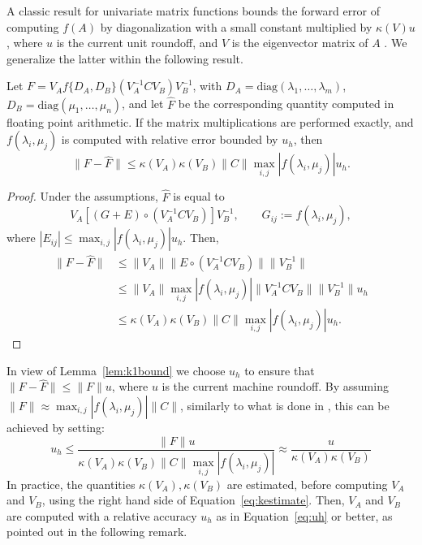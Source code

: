 \documentclass{siamart1116}
\newcommand{\norm}[1]{\lVert#1\rVert}
\begin{document}
A classic result for univariate matrix functions bounds
the forward error of computing $f(A)$ by diagonalization
with a small constant multiplied by $\kappa(V) u$, where 
$u$ is the current unit roundoff, and 
$V$ is the eigenvector matrix of $A$ \cite[page 82]{higham2008functions}. 
We generalize the latter within the following result.

\begin{lemma} \label{lem:k1bound}
  Let $F = V_A f\{ D_A, D_B \} (V_A^{-1} C V_B) V_B^{-1}$, 
  with $D_A = \mathrm{diag}(\lambda_1, \ldots, \lambda_m)$,
  $D_B = \mathrm{diag}(\mu_1, \ldots, \mu_n)$, 
  and let $\hat F$ be the corresponding  quantity computed 
  in floating point arithmetic. 
  If the matrix multiplications
  are performed exactly, and $f(\lambda_i, \mu_j)$ 
  is computed with relative error bounded by $u_h$, 
  then
  \[
    \norm{F - \hat F} \leq
      \kappa(V_A) \kappa(V_B) \norm{C} 
      \max_{i,j} |f(\lambda_i, \mu_j)| u_h.
  \]
\end{lemma}

\begin{proof}
    Under the assumptions, $\hat F$ is equal to
    \[
      V_A \left[ (G + E) \circ (V_A^{-1} C V_B) \right] V_B^{-1}, 
      \qquad 
      G_{ij} := f(\lambda_i, \mu_j), 
    \]
    where $|E_{ij}| \leq \max_{i,j} |f(\lambda_i, \mu_j)| u_h$. Then, 
    \begin{align*}
      \norm{F - \hat F} &\leq 
        \norm{V_A} \norm{E \circ (V_A^{-1} C V_B)} \norm{V_B^{-1}} \\
        &\leq \norm{V_A} 
        \max_{i,j} |f(\lambda_i, \mu_j)|
        \norm{V_A^{-1} C V_B} \norm{V_B^{-1}} u_h \\
        &\leq 
          \kappa(V_A) \kappa(V_B) \norm{C}
            \max_{i,j} |f(\lambda_i, \mu_j)|
        u_h.
    \end{align*}
\end{proof}

In view of Lemma~\ref{lem:k1bound} we 
choose $u_h$ to ensure that 
$\norm{F - \hat F} \leq \norm{F} u$, where $u$ is the current
machine roundoff. By assuming $\norm{F} \approx \max_{i,j} |f(\lambda_i, \mu_j)| \norm{C}$, similarly to what is done in \cite{higham2020multiprecision},
this can be achieved by setting:
\begin{equation} \label{eq:uh}
  u_h \leq \frac{\norm{F} u}{\kappa(V_A) \kappa(V_B) \norm{C}
            \max_{i,j} |f(\lambda_i, \mu_j)|}
    \approx \frac{u}{\kappa(V_A) \kappa(V_B)}
\end{equation}
In practice, the quantities $\kappa(V_A), \kappa(V_B)$ 
are estimated, before computing $V_A$ and $V_B$, using the right hand side of
Equation~\ref{eq:kestimate}. 
Then, $V_A$ and $V_B$ are computed
with a relative accuracy $u_h$ as in Equation~\ref{eq:uh} or better, as pointed out in the following remark. 
\end{document}
